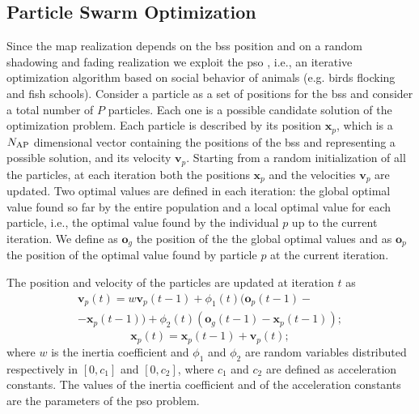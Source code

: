 \documentclass[twocolumns]{IEEEtran}
\begin{document}

\subsection{Particle Swarm Optimization}

Since the map realization depends on the \acp{bs} position and on a random shadowing and fading realization we exploit the \ac{pso} \cite{Kennedy-11}, i.e., an iterative optimization algorithm based on social behavior of animals (e.g. birds flocking and fish schools). Consider a particle as a set of positions for the \acp{bs} and consider a total number of $P$ particles. Each one is a possible candidate solution of the optimization problem. Each particle is described by its position $\bm{x}_p$, which is a $N_{\rm AP}$ dimensional vector containing the positions of the \acp{bs} and representing a possible solution, and its velocity $\bm{v}_p$.
Starting from a random initialization of all the particles, at each iteration both the positions $\bm{x}_p$ and the velocities $\bm{v}_p$ are updated. Two optimal values are defined in each iteration: the global optimal value found so far by the entire population and a local optimal value for each particle, i.e., the optimal value found by the individual $p$ up to the current iteration. We define as $\bm{o}_g$ the position of the the global optimal values and as $\bm{o}_p$ the position of the optimal value found by particle $p$ at the current iteration.

The position and velocity of the particles are updated at iteration $t$ as
   \begin{equation}\label{eq: v up}
\begin{split}
  \bm{v}_p(t) = w\bm{v}_p(t-1)+\phi_1(t)(\bm{o}_p(t-1)-\\
  -\bm{x}_p(t-1))+\phi_2(t)(\bm{o}_g(t-1)-\bm{x}_p(t-1));
  \end{split}
  \end{equation}
  \begin{equation}\label{eq: p up}
  \bm{x}_p(t) = \bm{x}_p(t-1) + \bm{v}_p(t);
 \end{equation}
where $w$ is the inertia coefficient and $\phi_1$ and $\phi_2$ are random variables distributed respectively in $[0,c_1]$ and $[0,c_2]$, where $c_1$ and $c_2$ are defined as acceleration constants. The values of the inertia coefficient and of the acceleration constants are the parameters of the \ac{pso} problem.
\end{document}
